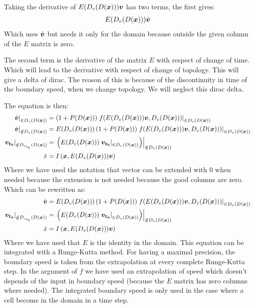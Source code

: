 Taking the derivative of $E(D_v(D({\boldsymbol {x}}))){\boldsymbol {v}}$ has two terms, the first gives:
\begin{equation}
	E(D_v(D({\boldsymbol {x}})))\dot{{\boldsymbol {v}}}
\end{equation}
Which uses $\dot{{\boldsymbol {v}}}$ but needs it only for the domain because outside the given column of the $E$ matrix is zero.

The second term is the derivative of the matrix $E$ with respect of change of time. Which will lead to the derivative with respect of change of topology.
This will give a delta of dirac.
The reason of this is because of the discontinuity in time of the boundary speed, when we change topology.
We will neglect this dirac delta. 

The equation is then:
\begin{align}
	\left.\dot{{\boldsymbol {v}}}\right|_{\in D_{v}(D({\boldsymbol {x}}))}&=\left(1+P(D({\boldsymbol {x}}))\right)\left.f(E(D_v(D({\boldsymbol {x}}))){\boldsymbol {v}},D_{v}(D({\boldsymbol {x}})))\right|_{\in D_{v}(D({\boldsymbol {x}}))}\\
	\left.\dot{{\boldsymbol {v}}}\right|_{\notin D_{v}(D({\boldsymbol {x}}))}&=E(D_v(D({\boldsymbol {x}})))\left(1+P(D({\boldsymbol {x}}))\right)\left.f(E(D_v(D({\boldsymbol {x}}))){\boldsymbol {v}},D_{v}(D({\boldsymbol {x}})))\right|_{\in D_{v}(D({\boldsymbol {x}}))}\\
	\left.{\boldsymbol {v_{t_0}}}\right|_{\notin D_{v_{t_0}}(D({\boldsymbol {x}}))}&=\left.\left(E(D_v(D({\boldsymbol {x}})))\left.{\boldsymbol {v_{t_0}}}\right|_{\in D_{v}(D({\boldsymbol {x}}))}\right)\right|_{\notin D_{v}(D({\boldsymbol {x}}))}\\
	\dot{x}&=I\left({\boldsymbol {x}},E(D_v(D({\boldsymbol {x}}))){\boldsymbol {v}}\right)\\
\end{align}
Where we have used the notation that vector can be extended with 0 when needed because the extension is not needed because the good columns are zero.
Which can be rewritten as:
\begin{align}\label{topo:equ:onediff}
	\dot{{\boldsymbol {v}}}&=E(D_v(D({\boldsymbol {x}})))\left(1+P(D({\boldsymbol {x}}))\right)\left.f(E(D_v(D({\boldsymbol {x}}))){\boldsymbol {v}},D_{v}(D({\boldsymbol {x}})))\right|_{\in D_{v}(D({\boldsymbol {x}}))}\\
	\left.{\boldsymbol {v_{t_0}}}\right|_{\notin D_{v_{t_0}}(D({\boldsymbol {x}}))}&=\left.\left(E(D_v(D({\boldsymbol {x}})))\left.{\boldsymbol {v_{t_0}}}\right|_{\in D_{v}(D({\boldsymbol {x}}))}\right)\right|_{\notin D_{v}(D({\boldsymbol {x}}))}\\
	\dot{x}&=I\left({\boldsymbol {x}},E(D_v(D({\boldsymbol {x}}))){\boldsymbol {v}}\right)\\
\end{align}
Where we have used that $E$ is the identity in the domain.
This equation can be integrated with a Runge-Kutta method.
For having a maximal precision, the boundary speed is taken from the extrapolation at every complete Runge-Kutta step.
In the argument of $f$ we have used an extrapolation of speed which doesn't depends of the input in boundary speed (because the $E$ matrix has zero columns where needed).
The integrated boundary speed is only used in the case where a cell become in the domain in a time step.

